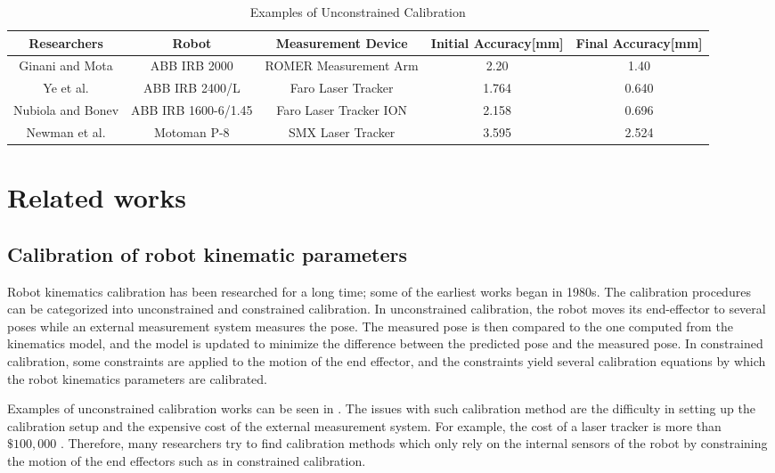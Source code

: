 \renewcommand{\arraystretch}{1.5}
\begin{table*}[htp]
\caption{Examples of Unconstrained Calibration}
\label{tab:unconstrained_calib}
\centering
\begin{tabular}{c c c c c}
\toprule
\textbf{Researchers} &  \textbf{Robot} & \textbf{Measurement Device} &  \textbf{Initial Accuracy[mm]}  & \textbf{Final Accuracy[mm]}\\
\midrule
Ginani and Mota \cite{Ginani2011} & ABB IRB 2000 & ROMER Measurement Arm & 2.20 & 1.40 \\
Ye et al. \cite{Ye2006} & ABB IRB 2400/L & Faro Laser Tracker & 1.764 & 0.640 \\
Nubiola and Bonev \cite{Nubiola2013} & ABB IRB 1600-6/1.45 & Faro Laser Tracker ION & 2.158 & 0.696 \\ 
Newman et al. \cite{Newman2000} & Motoman P-8 & SMX Laser Tracker & 3.595 & 2.524\\
\bottomrule
\end{tabular}
\end{table*}

\section{Related works}
\label{sec:related}
\subsection{Calibration of robot kinematic parameters}
\label{sec:kine_calib}



Robot kinematics calibration has been researched for a long time; some of the earliest works began in 1980s. The calibration procedures can be categorized into unconstrained and constrained calibration. In unconstrained calibration, the robot moves its end-effector to several poses while an external measurement system measures the pose. The measured pose is then compared to the one computed from the kinematics model, and the model is updated to minimize the difference between the predicted pose and the measured pose. In constrained calibration, some constraints are applied to the motion of the end effector, and the constraints yield several calibration equations by which the robot kinematics parameters are calibrated. 


Examples of unconstrained calibration works can be seen in . The issues with such calibration method are the difficulty in setting up the calibration setup and the expensive cost of the external measurement system. For example, the cost of a laser tracker is more than $\$100,000$ \cite{Nubiola2013}. Therefore, many researchers try to find calibration methods which only rely on the internal sensors of the robot by constraining the motion of the end effectors such as in constrained calibration. 

